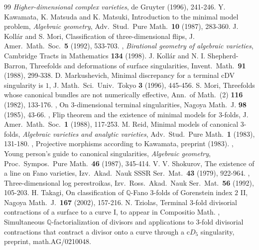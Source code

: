 \documentclass[a4paper,11pt]{amsart}
\theoremstyle{definition}
\theoremstyle{remark}
\numberwithin{equation}{section}
\newcommand{\bQ}{{\mathbb Q}}
\begin{document}
\begin{thebibliography}{99}
\textit{Higher-dimensional complex varieties},
de Gruyter (1996), 241-246.
Y. Kawamata, K. Matsuda and K. Matsuki,
Introduction to the minimal model problem,
\textit{Algebraic geometry},
Adv.\ Stud.\ Pure Math.\ \textbf{10} (1987), 283-360.
J. Koll\'ar and S. Mori,
Classification of three-dimensional flips,
J. Amer.\ Math.\ Soc.\ \textbf{5} (1992), 533-703.
\bysame,
\textit{Birational geometry of algebraic varieties},
Cambridge Tracts in Mathematics \textbf{134} (1998).
J. Koll\'ar and N. I. Shepherd-Barron,
Threefolds and deformations of surface singularities,
Invent.\ Math.\ \textbf{91} (1988), 299-338.
D. Markushevich,
Minimal discrepancy for a terminal cDV singularity is $1$,
J. Math.\ Sci.\ Univ.\ Tokyo \textbf{3} (1996), 445-456.
S. Mori,
Threefolds whose canonical bundles are not numerically effective,
Ann.\ of Math.\ (2) \textbf{116} (1982), 133-176.
\bysame,
On $3$-dimensional terminal singularities,
Nagoya Math.\ J. \textbf{98} (1985), 43-66.
\bysame,
Flip theorem and the existence of minimal models for $3$-folds,
J. Amer.\ Math.\ Soc.\ \textbf{1} (1988), 117-253.
M. Reid,
Minimal models of canonical $3$-folds,
\textit{Algebraic varieties and analytic varieties},
Adv.\ Stud.\ Pure Math.\ \textbf{1} (1983), 131-180.
\bysame,
Projective morphisms according to Kawamata,
preprint (1983).
\bysame,
Young person's guide to canonical singularities,
\textit{Algebraic geometry},
Proc.\ Sympos.\ Pure Math.\ \textbf{46} (1987), 345-414.
V. V. Shokurov,
The existence of a line on Fano varieties,
Izv.\ Akad.\ Nauk SSSR Ser.\ Mat.\ \textbf{43} (1979), 922-964.
\bysame,
Three-dimensional log perestroikas,
Izv.\ Ross.\ Akad.\ Nauk Ser.\ Mat.\ \textbf{56} (1992), 105-203.
H. Takagi,
On classification of $\bQ$-Fano $3$-folds of Gorenstein index $2$ II,
Nagoya Math.\ J.\ \textbf{167} (2002), 157-216.
N. Tziolas,
Terminal $3$-fold divisorial contractions of a surface to a curve I,
to appear in Compositio Math.
\bysame,
Simultaneous $\bQ$-factorialization of divisors and
applications to $3$-fold divisorial contractions
that contract a divisor onto a curve through a c$D_5$ singularity,
preprint, math.AG/0210048.
\end{thebibliography}
\end{document}
